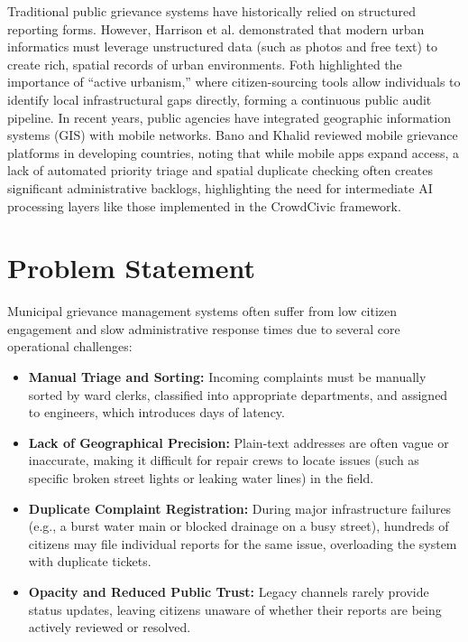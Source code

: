 \documentclass[conference]{IEEEtran}
\begin{document}
Traditional public grievance systems have historically relied on structured reporting forms. However, Harrison et al. \cite{ref3} demonstrated that modern urban informatics must leverage unstructured data (such as photos and free text) to create rich, spatial records of urban environments. Foth \cite{ref4} highlighted the importance of ``active urbanism,'' where citizen-sourcing tools allow individuals to identify local infrastructural gaps directly, forming a continuous public audit pipeline. In recent years, public agencies have integrated geographic information systems (GIS) with mobile networks. Bano and Khalid \cite{ref9} reviewed mobile grievance platforms in developing countries, noting that while mobile apps expand access, a lack of automated priority triage and spatial duplicate checking often creates significant administrative backlogs, highlighting the need for intermediate AI processing layers like those implemented in the CrowdCivic framework.

\section{Problem Statement}
Municipal grievance management systems often suffer from low citizen engagement and slow administrative response times due to several core operational challenges:
\begin{itemize}
    \item \textbf{Manual Triage and Sorting:} Incoming complaints must be manually sorted by ward clerks, classified into appropriate departments, and assigned to engineers, which introduces days of latency.
    \item \textbf{Lack of Geographical Precision:} Plain-text addresses are often vague or inaccurate, making it difficult for repair crews to locate issues (such as specific broken street lights or leaking water lines) in the field.
    \item \textbf{Duplicate Complaint Registration:} During major infrastructure failures (e.g., a burst water main or blocked drainage on a busy street), hundreds of citizens may file individual reports for the same issue, overloading the system with duplicate tickets.
    \item \textbf{Opacity and Reduced Public Trust:} Legacy channels rarely provide status updates, leaving citizens unaware of whether their reports are being actively reviewed or resolved.
\end{itemize}
\end{document}
